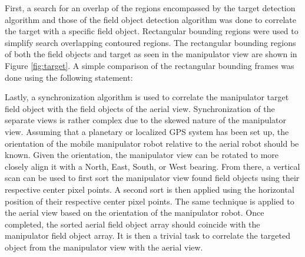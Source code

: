 
    First, a search for an overlap of the regions encompassed by 
      the target detection algorithm and those of the field object 
      detection algorithm was done to correlate the target with
      a specific field object.
    Rectangular bounding regions were used to simplify search 
      overlapping contoured regions.
    The rectangular bounding regions of both the field objects
      and target as seen in the manipulator view are shown in
      Figure \ref{fig:target}.
    A simple comparison of the rectangular bounding frames was
      done using the following statement:

    Lastly, a synchronization algorithm is used to correlate the 
      manipulator target field object with the field objects of
      the aerial view.
    Synchronization of the separate views is rather complex due
      to the skewed nature of the manipulator view.
    Assuming that a planetary or localized GPS system has been 
      set up, the orientation of the mobile manipulator robot
      relative to the aerial robot should be known.
    Given the orientation, the manipulator view can be rotated 
      to more closely align it with a North, East, South, or
      West bearing.
    From there, a vertical scan can be used to first sort the
      manipulator view found field objects using their respective 
      center pixel points.
    A second sort is then applied using the horizontal position
      of their respective center pixel points.
    The same technique is applied to the aerial view based on
      the orientation of the manipulator robot.
    Once completed, the sorted aerial field object array should
      coincide with the manipulator field object array.
    It is then a trivial task to correlate the targeted object
      from the manipulator view with the aerial view.

